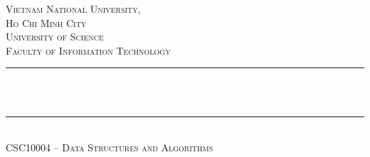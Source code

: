 \thispagestyle{empty}
\begin{titlepage}
	\begin{center}
		\makeatletter
		\newcommand{\HRule}{\rule{\linewidth}{0.4mm}}

		\textsc{\LARGE Vietnam National University,\\Ho Chi Minh City}\\[1.5cm]
		\textsc{\Large University of Science}\\[0.5cm]
		\textsc{\Large Faculty of Information Technology}\\[1.5cm]

		{\HRule}\\[1cm]
		{\huge \bfseries \@title}\\[0.5cm]
		{\HRule}\\[2cm]

		\textsc{\large CSC10004 -- Data Structures and Algorithms}\\[0.5cm]

		\vfill\vfill\vfill

		{\large \@author}\\[1.5cm]
		{\large \@date}
		\makeatother
	\end{center}
\end{titlepage}